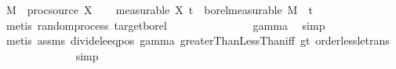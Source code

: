 \begin{isabellebody}
\ {\isacharquery}{\kern0pt}M\ {\isacharequal}{\kern0pt}\ {\isachardoublequoteopen}proc{\isacharunderscore}{\kern0pt}source\ X{\isachardoublequoteclose}\isanewline
\ \ \isamarkupfalse%
\ {\isacharbrackleft}{\kern0pt}measurable{\isacharbrackright}{\kern0pt}{\isacharcolon}{\kern0pt}\ {\isachardoublequoteopen}X\ t\ {\isasymin}\ borel{\isacharunderscore}{\kern0pt}measurable\ {\isacharquery}{\kern0pt}M{\isachardoublequoteclose}\ \ t\isanewline
\ \ \ \ \isamarkupfalse%
\ {\isacharparenleft}{\kern0pt}metis\ random{\isacharunderscore}{\kern0pt}process\ target{\isacharunderscore}{\kern0pt}borel{\isacharparenright}{\kern0pt}\isanewline
\ \ \isamarkupfalse%
\ {\isachardoublequoteopen}{}\ {\isacharless}{\kern0pt}\ {\isasymgamma}{\isachardoublequoteclose}\ {\isachardoublequoteopen}{\isasymgamma}\ {\isacharless}{\kern0pt}\ {}{\isachardoublequoteclose}\isanewline
\ \ \ \ \isamarkupfalse%
\ gamma\ \isamarkupfalse%
\ simp\isanewline
\ \ \ \ \isamarkupfalse%
\ {\isacharparenleft}{\kern0pt}metis\ assms{\isacharparenleft}{\kern0pt}{}{\isacharparenright}{\kern0pt}\ divide{\isacharunderscore}{\kern0pt}le{\isacharunderscore}{\kern0pt}eq{\isacharunderscore}{\kern0pt}{}{\isacharunderscore}{\kern0pt}pos\ gamma\ greaterThanLessThan{\isacharunderscore}{\kern0pt}iff\ gt{\isacharunderscore}{\kern0pt}{}{\isacharparenleft}{\kern0pt}{}{\isacharparenright}{\kern0pt}\ order{\isacharunderscore}{\kern0pt}less{\isacharunderscore}{\kern0pt}le{\isacharunderscore}{\kern0pt}trans{\isacharparenright}{\kern0pt}\isanewline
\ \ \isamarkupfalse%
\ \isamarkupfalse%
\ {\isachardoublequoteopen}{\isasymgamma}\ {\isasymin}\ {\isacharbraceleft}{\kern0pt}{}{\isacharless}{\kern0pt}{\isachardot}{\kern0pt}{\isachardot}{\kern0pt}{}{\isacharbraceright}{\kern0pt}{\isachardoublequoteclose}\isanewline
\ \ \ \ \isamarkupfalse%
\ simp%
\begin{isamarkuptext}%

\end{isamarkuptext}
\end{isabellebody}
